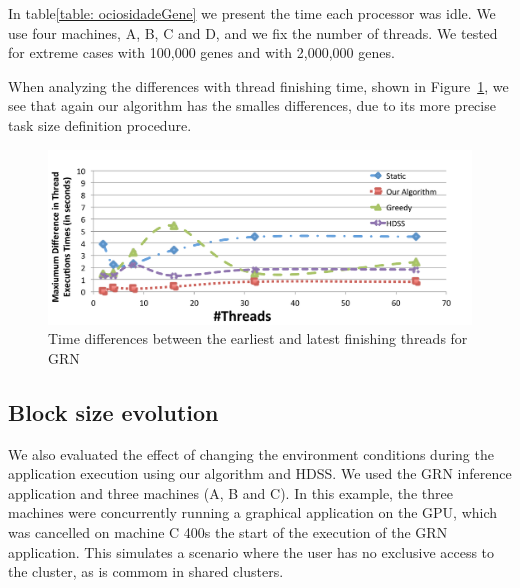 \documentclass[journal]{IEEEtran}
\begin{document}
In table\ref{table: ociosidadeGene} we present the time each processor was idle. We use four machines, A, B, C and D, and we fix the number of threads. We tested for extreme cases with 100,000 genes and with 2,000,000 genes.

When analyzing the differences with thread finishing time, shown in
Figure~\ref{fig:GeneDiferenca}, we see that again our algorithm has the smalles
differences, due to its more precise task size definition procedure.

\begin{figure}[htb]
	\begin{center}
	\centering
			\includegraphics[scale=0.33]{MaximoDiferenca_fabrizio_novo.pdf}
	\caption{Time differences between the earliest and latest finishing threads for GRN}
	\label{fig:GeneDiferenca}
	\end{center}
\end{figure}

\subsection{Block size evolution}

We also evaluated the effect of changing the environment conditions during the application execution using our algorithm and HDSS. We used the GRN inference application and three machines (A, B and C). In this example, the three machines were concurrently running a graphical application on the GPU, which was cancelled on machine C 400s the start of the execution of the GRN application. This simulates a scenario where the user has no exclusive access to the cluster, as is commom in shared clusters.


\end{document}
